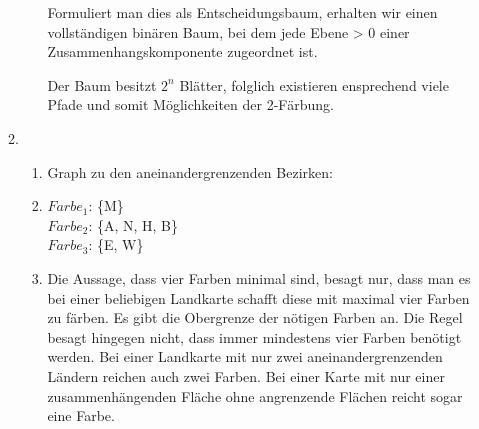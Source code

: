 \documentclass{article}
\begin{document}
\begin{enumerate}[\bfseries1.]
\begin{enumerate}
\begin{enumerate}
                Formuliert man dies als Entscheidungsbaum, erhalten wir einen
                vollständigen binären Baum, bei dem jede Ebene > 0 einer
                Zusammenhangskomponente zugeordnet ist.
                
                Der Baum besitzt $2^n$ Blätter, folglich existieren ensprechend
                viele Pfade und somit Möglichkeiten der 2-Färbung.
        \end{enumerate}
    \item %
        \begin{enumerate}
            \item Graph zu den aneinandergrenzenden Bezirken: %
            
                
            \item  %
                $Farbe_1$: \{M\}
                \\$Farbe_2$: \{A, N, H, B\}
                \\$Farbe_3$: \{E, W\}
            \item %
                Die Aussage, dass vier Farben minimal sind, besagt nur, dass man es bei einer
                beliebigen Landkarte schafft diese mit maximal vier Farben zu färben. Es gibt
                die Obergrenze der nötigen Farben an. Die Regel besagt hingegen nicht, dass 
                immer mindestens vier Farben benötigt werden. Bei einer Landkarte mit nur 
                zwei aneinandergrenzenden Ländern reichen auch zwei Farben. Bei einer Karte
                mit nur einer zusammenhängenden Fläche ohne angrenzende Flächen reicht sogar eine Farbe.
            

\end{enumerate}
\end{enumerate}
\end{enumerate}
\end{document}
